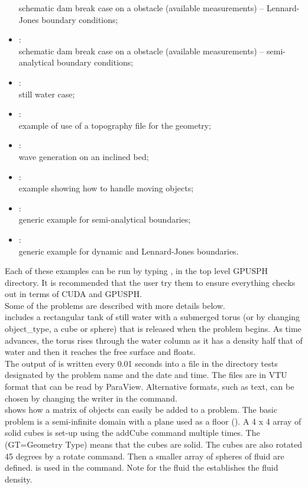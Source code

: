\documentclass{../GPUSPHtemplate}
\begin{document}
\begin{itemize}
schematic dam break case on a obstacle (available measurements) -- Lennard-Jones boundary conditions;
\item	{}:\\
schematic dam break case on a obstacle (available measurements) -- semi-analytical boundary conditions;
\item	{}:\\
still water case;
\item	{}:\\
example of use of a topography file for the geometry;
\item	{}:\\
wave generation on an inclined bed;
\item	{}:\\
example showing how to handle moving objects;
\item	{}:\\
generic example for semi-analytical boundaries;
\item	{}:\\
generic example for dynamic and Lennard-Jones boundaries.
\end{itemize}

Each of these examples can be run by typing , 
in the top level GPUSPH directory.  
It is recommended that the user try them to ensure 
everything checks out in terms of CUDA and GPUSPH. \\

Some of the problems are described with more details below.\\

 includes a rectangular tank of still water with a submerged torus 
(or by changing object_type, a cube or sphere) that is released when the problem begins.  
As time advances, the torus rises through the water column as it has a 
density half that of water and then it reaches the free surface and floats.  \\
The output of  is written every 0.01 seconds into a file 
in the directory tests designated by the problem name and the date and time.  
The files are in VTU format that can be read by ParaView.  
Alternative formats, such as text, can be chosen by changing the writer in the  command. \\

 shows how a matrix of objects can easily be added to a problem.  
The basic problem is a semi-infinite domain with a plane used as a floor ().  
A 4 x 4 array of solid cubes is set-up using the addCube command multiple times.   
The   (GT=Geometry Type) means that the cubes are solid. 
The cubes are also rotated 45 degrees by a rotate command. 
Then a smaller array of spheres of fluid are defined.  
 is used in the  command.  
Note for the fluid the  establishes the fluid density.  \\
\end{document}

